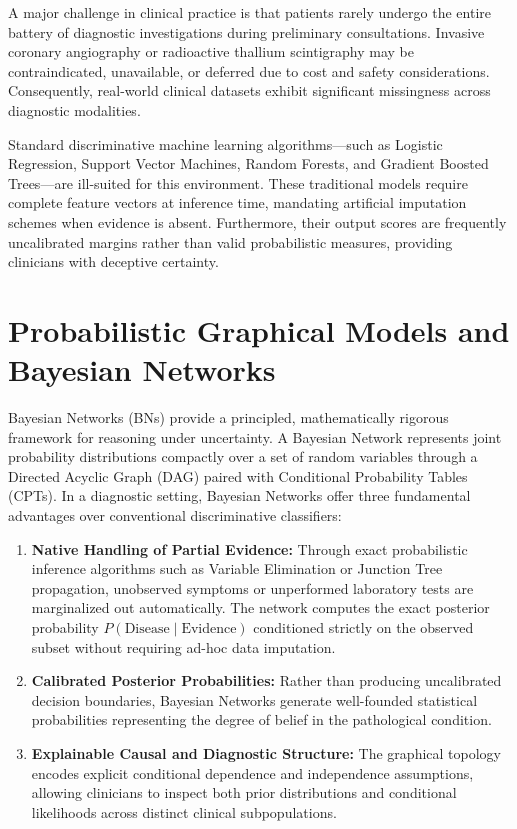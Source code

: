 \documentclass[12pt,a4paper]{report}
\begin{document}
A major challenge in clinical practice is that patients rarely undergo the entire battery of diagnostic investigations during preliminary consultations. Invasive coronary angiography or radioactive thallium scintigraphy may be contraindicated, unavailable, or deferred due to cost and safety considerations. Consequently, real-world clinical datasets exhibit significant missingness across diagnostic modalities. 

Standard discriminative machine learning algorithms---such as Logistic Regression, Support Vector Machines, Random Forests, and Gradient Boosted Trees---are ill-suited for this environment. These traditional models require complete feature vectors at inference time, mandating artificial imputation schemes when evidence is absent. Furthermore, their output scores are frequently uncalibrated margins rather than valid probabilistic measures, providing clinicians with deceptive certainty.

\section{Probabilistic Graphical Models and Bayesian Networks}

Bayesian Networks (BNs) provide a principled, mathematically rigorous framework for reasoning under uncertainty. A Bayesian Network represents joint probability distributions compactly over a set of random variables through a Directed Acyclic Graph (DAG) paired with Conditional Probability Tables (CPTs). In a diagnostic setting, Bayesian Networks offer three fundamental advantages over conventional discriminative classifiers:

\begin{enumerate}
\item \textbf{Native Handling of Partial Evidence:} Through exact probabilistic inference algorithms such as Variable Elimination or Junction Tree propagation, unobserved symptoms or unperformed laboratory tests are marginalized out automatically. The network computes the exact posterior probability $P(\text{Disease} \mid \text{Evidence})$ conditioned strictly on the observed subset without requiring ad-hoc data imputation.
\item \textbf{Calibrated Posterior Probabilities:} Rather than producing uncalibrated decision boundaries, Bayesian Networks generate well-founded statistical probabilities representing the degree of belief in the pathological condition.
\item \textbf{Explainable Causal and Diagnostic Structure:} The graphical topology encodes explicit conditional dependence and independence assumptions, allowing clinicians to inspect both prior distributions and conditional likelihoods across distinct clinical subpopulations.
\end{enumerate}
\end{document}
